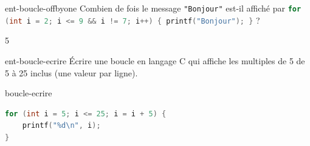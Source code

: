 \begin{question}{ent-boucle-offbyone}
    Combien de fois le message \texttt{"Bonjour"} est-il affiché par \lstinline[language=C]|for (int i = 2; i <= 9 && i != 7; i++) { printf("Bonjour"); }| ?
    \begin{multicols}{5}
        \begin{reponses}
        \end{reponses}
    \end{multicols}
\end{question}

\begin{question}{ent-boucle-ecrire}
    Écrire une boucle en langage C qui affiche les multiples de 5 de 5 à 25 inclus (une valeur par ligne).
\end{question}

\begin{UPSTIcorrectionP}{boucle-ecrire}
    \begin{lstlisting}[language=c]
for (int i = 5; i <= 25; i = i + 5) {
    printf("%d\n", i);
}
    \end{lstlisting}
\end{UPSTIcorrectionP}
